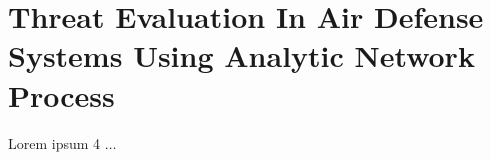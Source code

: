 \documentclass[12pt]{article} %
\begin{document}
\section*{Threat Evaluation In Air Defense Systems Using Analytic Network Process \cite{Unver2019ThreatEI}}
Lorem ipsum 4 $\ldots$


\newpage
\begin{center}


\end{center}
\end{document}

